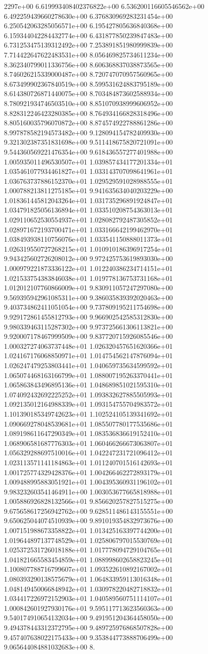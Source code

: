 2297e+00	6.619993408402376822e+00	6.536200116605546562e+00	6.492259439660278630e+00	6.376830969283231454e+00	6.250542063285056571e+00	6.195427805636840368e+00	6.159344042284432774e+00	6.431877850239847483e+00	6.731253475139312492e+00	7.253891851980999839e+00	7.714422647622483531e+00	8.056469825734611234e+00	8.362340799011336756e+00	8.606368837038873565e+00	8.746026215339000487e+00	8.720747070957560965e+00	8.673499902367840519e+00	8.599531624883795189e+00	8.614380726871440075e+00	8.703484873602588934e+00	8.780921934746503510e+00	8.851070938999606952e+00	8.828312246423280385e+00	8.764934166828318496e+00	8.805160035796070872e+00	8.874574922788861286e+00	8.997878582194573482e+00	9.128094154782409930e+00	9.321302387351831698e+00	9.511418675820721091e+00	9.544360569221476354e+00	9.618436557277401988e+00	1.005935011496530507e+01	1.039857434177201334e+01	1.035461077934461827e+01	1.033143707098641961e+01	1.036763737886152370e+01	1.029529591028988555e+01	1.000788213811275185e+01	9.941635634040203229e+00	1.018361445812043264e+01	1.031735296891924847e+01	1.034791825056136894e+01	1.033510208754363013e+01	1.029110652530554937e+01	1.028082792487305852e+01	1.028971672193700471e+01	1.033166642199462970e+01	1.038493938110756076e+01	1.033541150888011373e+01	1.026319550727268215e+01	1.010910186396917254e+01	9.943425602726208012e+00	9.972425753619893030e+00	1.000979221873336122e+01	1.012240386234714151e+01	1.021533754383846038e+01	1.019778136753731168e+01	1.012012107760866009e+01	9.830911057247297080e+00	9.569395942961085311e+00	9.386035839392020463e+00	9.403734862411051054e+00	9.737809195211754698e+00	9.929172861455812793e+00	9.966902542585312830e+00	9.980339463115287302e+00	9.973725661306113821e+00	9.920007178467999509e+00	9.837720715926085546e+00	1.000327274063737448e+01	1.026320457651620366e+01	1.024167176068850971e+01	1.014754562147876094e+01	1.026247479253803441e+01	1.040659735634599592e+01	1.065074468163166799e+01	1.088007195263370441e+01	1.065863843496895136e+01	1.048689851021595310e+01	1.074092432692225252e+01	1.093832627885505993e+01	1.092135012164988339e+01	1.093154755704983572e+01	1.101390185349742623e+01	1.102524105139341692e+01	1.090669278048539681e+01	1.085507780177535686e+01	1.089198611647290349e+01	1.083536836619152410e+01	1.068906581687776303e+01	1.060466266673063807e+01	1.056329288697510016e+01	1.042247231721096412e+01	1.023113571141184863e+01	1.011240701516142693e+01	1.001725774329428376e+01	1.004266462272893179e+01	1.009488995883051921e+01	1.004395360931196102e+01	9.983232603541464911e+00	1.003053677665818988e+01	1.005886926828132566e+01	9.856620257827515275e+00	9.675658617256942762e+00	9.628511486143155551e+00	9.650625044074510939e+00	9.891019354832973676e+00	1.007151988673358822e+01	1.013425163397744200e+01	1.019644897137748529e+01	1.025806797015530769e+01	1.025372531726018188e+01	1.017778094729104765e+01	1.041821665583454859e+01	1.088998602658823245e+01	1.100807788716799607e+01	1.093522610892167002e+01	1.080393290138575679e+01	1.064833959113016348e+01	1.048149450066848942e+01	1.030978220482718832e+01	1.034417226972152903e+01	1.040589560751114107e+01	1.000842601927930176e+01	9.595117713623560363e+00	9.540174910654132034e+00	9.491951204364458050e+00	9.494378443312372795e+00	9.489725976868507828e+00	9.457407638022175433e+00	9.353844773888706499e+00	9.065644084881032683e+00	8.